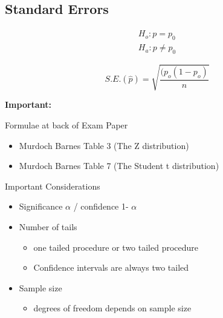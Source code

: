 \documentclass[]{report}
\begin{document}
\subsection{Standard Errors}

\begin{eqnarray*}
H_{o}: p = p_{0} \\
H_{a}: p \neq p_{0}
\end{eqnarray*}

\begin{equation}
S.E.(\hat{p})=\sqrt{\frac{(p_{o}(1-p_{o})}{n}}
\end{equation}



\begin{framed}

\textbf{Important:}

Formulae at back of Exam Paper
\begin{itemize}
\item Murdoch Barnes Table 3 (The Z distribution)
\item Murdoch Barnes Table 7 (The Student t distribution)

\end{itemize}

Important Considerations



\begin{itemize}
\item Significance  $\alpha$   /    confidence 1- $\alpha$
\item 

Number of tails   
\begin{itemize}
\item one tailed procedure or two tailed procedure
\item Confidence intervals are always two tailed
\end{itemize}


\item Sample size   
\begin{itemize}
\item degrees of freedom depends on sample size
\end{itemize} 
\end{itemize}
\end{framed}
\end{document}
